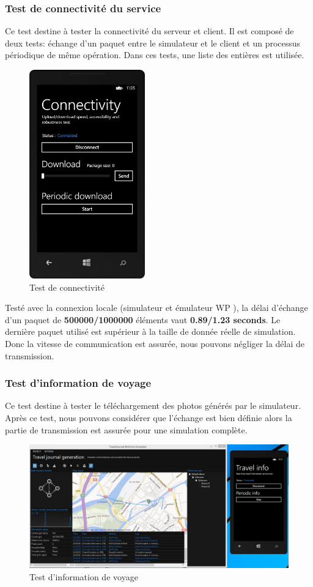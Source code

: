\documentclass{article}
\begin{document}
\subsubsection{\large Test de connectivité du service}
Ce test destine à tester la connectivité du serveur et client. Il est composé de deux tests: échange d'un paquet entre le simulateur et le client et un processus périodique de même opération. Dans ces tests, une liste des entières est utilisée.  
\begin{figure}[h!]
\centering
\includegraphics[width=50mm]{TESTCONNECT.jpg}
\caption{Test de connectivité}
\end{figure}
Testé avec la connexion locale (simulateur et émulateur WP ), la délai d'échange d'un paquet de \textbf{500000/1000000} éléments vaut \textbf{0.89/1.23 seconds}. Le dernière paquet utilisé est supérieur à la taille de donnée réelle de simulation. Donc la vitesse de communication est assurée, nous pouvons négliger la délai de transmission.

\newpage
\subsubsection{\large Test d'information de voyage}
Ce test destine à tester le téléchargement des photos générés par le simulateur. Après ce test, nous pouvons considérer que l'échange est bien définie alors la partie de transmission est assurée pour une simulation complète.

\begin{figure}[h!]
\centering
\includegraphics[width=150mm]{TESTINFO.jpg}
\caption{Test d'information de voyage}
\end{figure}
\end{document}
